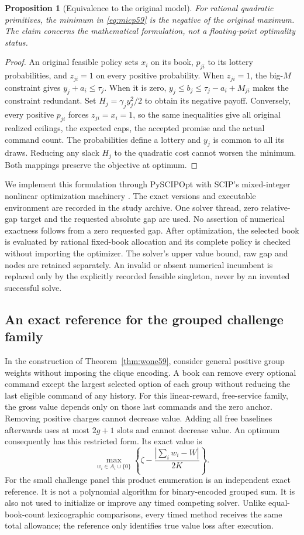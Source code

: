 \documentclass[11pt,letterpaper]{article}
\newtheorem{proposition}[theorem]{Proposition}
\theoremstyle{definition}\newtheorem{remark}[theorem]{Remark}
\begin{document}
\begin{proposition}[Equivalence to the original model]\label{prop:micp59}
For rational quadratic primitives, the minimum in \eqref{eq:micp59} is the negative of the original maximum. The claim concerns the mathematical formulation, not a floating-point optimality status.
\end{proposition}
\begin{proof}
An original feasible policy sets $x_i$ on its book, $p_{ji}$ to its lottery probabilities, and $z_{ji}=1$ on every positive probability. When $z_{ji}=1$, the big-$M$ constraint gives $y_j+a_i\leq\tau_j$. When it is zero, $y_j\leq b_j\leq\tau_j-a_i+M_{ji}$ makes the constraint redundant. Set $H_j=\gamma_jy_j^2/2$ to obtain its negative payoff. Conversely, every positive $p_{ji}$ forces $z_{ji}=x_i=1$, so the same inequalities give all original realized ceilings, the expected caps, the accepted promise and the actual command count. The probabilities define a lottery and $y_j$ is common to all its draws. Reducing any slack $H_j$ to the quadratic cost cannot worsen the minimum. Both mappings preserve the objective at optimum.
\end{proof}

We implement this formulation through PySCIPOpt \citep{Maher2016} with SCIP's mixed-integer nonlinear optimization machinery \citep{Bolusani2024}. The exact versions and executable environment are recorded in the study archive. One solver thread, zero relative-gap target and the requested absolute gap are used. No assertion of numerical exactness follows from a zero requested gap. After optimization, the selected book is evaluated by rational fixed-book allocation and its complete policy is checked without importing the optimizer. The solver's upper value bound, raw gap and nodes are retained separately. An invalid or absent numerical incumbent is replaced only by the explicitly recorded feasible singleton, never by an invented successful solve.

\subsection{An exact reference for the grouped challenge family}
In the construction of Theorem~\ref{thm:wone59}, consider general positive group weights without imposing the clique encoding. A book can remove every optional command except the largest selected option of each group without reducing the last eligible command of any history. For this linear-reward, free-service family, the gross value depends only on those last commands and the zero anchor. Removing positive charges cannot decrease value. Adding all free baselines afterwards uses at most $2g+1$ slots and cannot decrease value. An optimum consequently has this restricted form. Its exact value is
\[
 \max_{w_i\in A_i\cup\{0\}}\left\{\zeta-\frac{|\sum_iw_i-W|}{2K}\right\}.
\]
For the small challenge panel this product enumeration is an independent exact reference. It is not a polynomial algorithm for binary-encoded grouped sum. It is also not used to initialize or improve any timed competing solver. Unlike equal-book-count lexicographic comparisons, every timed method receives the same total allowance; the reference only identifies true value loss after execution.
\end{document}
